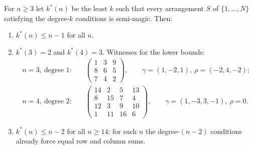 \begin{proposition}
\label{prop:perm_threshold}
For $n\ge3$ let $k^{*}(n)$ be the least $k$ such that every arrangement $S$ of $\{1,\dots,N\}$ satisfying
the degree-$k$ conditions is semi-magic.  Then:
\begin{enumerate}
\item $k^{*}(n)\le n-1$ for all $n$.
\item $k^{*}(3)=2$ and $k^{*}(4)=3$.  Witnesses for the lower bounds:
\begin{align*}
n=3,\ \text{degree }1:&\quad
\begin{pmatrix}1&3&9\\8&6&5\\7&4&2\end{pmatrix},\qquad \gamma=(1,-2,1),\ \rho=(-2,4,-2);\\[2pt]
n=4,\ \text{degree }2:&\quad
\begin{pmatrix}14&2&5&13\\8&15&7&4\\12&3&9&10\\1&11&16&6\end{pmatrix},\qquad \gamma=(1,-3,3,-1),\ \rho=0.
\end{align*}
\item $k^{*}(n)\le n-2$ for all $n\ge14$: for such $n$ the degree-$(n-2)$ conditions already force equal row and column sums.
\end{enumerate}
\end{proposition}

